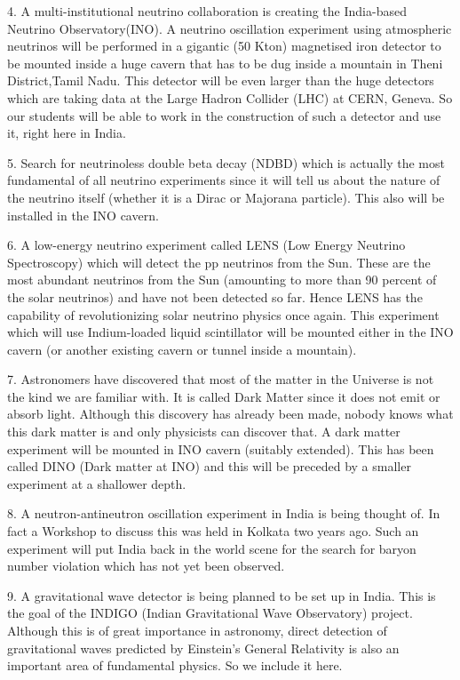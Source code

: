 4. A multi-institutional neutrino collaboration is creating the India-based
Neutrino Observatory(INO). A neutrino oscillation experiment using atmospheric neutrinos will be performed in a gigantic (50 Kton) magnetised iron
detector to be mounted inside a huge cavern that has to be dug inside a
mountain in Theni District,Tamil Nadu. This detector will be even larger
than the huge detectors which are taking data at the Large Hadron Collider (LHC) at CERN, Geneva. So our students will be able to work in the
construction of such a detector and use it, right here in India. 


5. Search for neutrinoless double beta decay (NDBD) which is actually
the most fundamental of all neutrino experiments since it will tell us about
the nature of the neutrino itself (whether it is a Dirac or Majorana particle).
This also will be installed in the INO cavern. 


6. A low-energy neutrino experiment called LENS (Low Energy Neutrino
Spectroscopy) which will detect the pp neutrinos from the Sun. These are
the most abundant neutrinos from the Sun (amounting to more than 90 percent of the solar neutrinos) and have not been detected so far. Hence LENS
has the capability of revolutionizing solar neutrino physics once again. This
experiment which will use Indium-loaded liquid scintillator will be mounted
either in the INO cavern (or another existing cavern or tunnel inside a mountain). 


7. Astronomers have discovered that most of the matter in the Universe
is not the kind we are familiar with. It is called Dark Matter since it does not
emit or absorb light. Although this discovery has already been made, nobody
knows what this dark matter is and only physicists can discover that. A dark
matter experiment will be mounted in INO cavern (suitably extended). This
has been called DINO (Dark matter at INO) and this will be preceded by a
smaller experiment at a shallower depth. 


8. A neutron-antineutron oscillation experiment in India is being thought
of. In fact a Workshop to discuss this was held in Kolkata two years ago.
Such an experiment will put India back in the world scene for the search for
baryon number violation which has not yet been observed. 


9. A gravitational wave detector is being planned to be set up in India.
This is the goal of the INDIGO (Indian Gravitational Wave Observatory)
project. Although this is of great importance in astronomy, direct detection
of gravitational waves predicted by Einstein's General Relativity is also an
important area of fundamental physics. So we include it here. 


